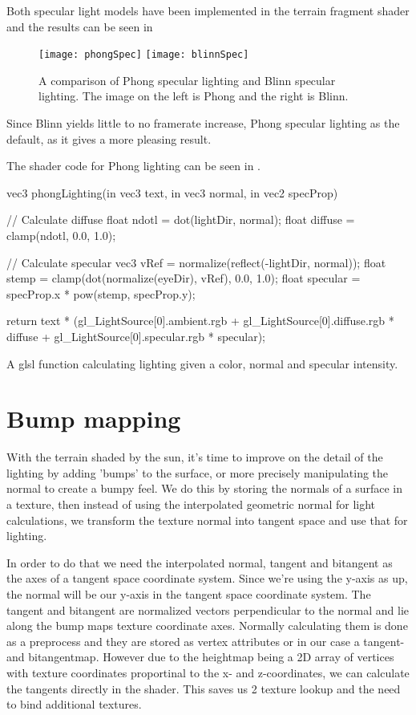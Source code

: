 Both specular light models have been implemented in the terrain
fragment shader and the results can be seen in 

\begin{figure}
  \label{fig:specularLight}
  \centering
  \texttt{[image: phongSpec]}
  \texttt{[image: blinnSpec]}
  \caption{A comparison of Phong specular lighting and Blinn specular lighting. The image on the left is Phong and the right is Blinn.}
\end{figure}

Since Blinn yields little to no framerate increase, Phong specular
lighting as the default, as it gives a more pleasing result.

The shader code for Phong lighting can be seen in
.

\begin{listing}
\label{lst:phongLighting}
\centering
\begin{cppcode}
vec3 phongLighting(in vec3 text, in vec3 normal, in vec2 specProp){
  // Calculate diffuse
  float ndotl = dot(lightDir, normal);
  float diffuse = clamp(ndotl, 0.0, 1.0);
  
  // Calculate specular
  vec3 vRef = normalize(reflect(-lightDir, normal));
  float stemp = clamp(dot(normalize(eyeDir), vRef), 0.0, 1.0);
  float specular = specProp.x * pow(stemp, specProp.y);
  
  return text * (gl_LightSource[0].ambient.rgb + 
                 gl_LightSource[0].diffuse.rgb * diffuse + 
                 gl_LightSource[0].specular.rgb * specular);
}
\end{cppcode}
\caption{A glsl function calculating lighting given a color, normal and specular intensity.}
\end{listing}


\section{Bump mapping}

With the terrain shaded by the sun, it's time to improve on the detail
of the lighting by adding 'bumps' to the surface, or more precisely
manipulating the normal to create a bumpy feel. We do this by storing
the normals of a surface in a texture, then instead of using the
interpolated geometric normal for light calculations, we transform the
texture normal into tangent space and use that for lighting.

In order to do that we need the interpolated normal, tangent and
bitangent as the axes of a tangent space coordinate system. Since
we're using the y-axis as up, the normal will be our y-axis in the
tangent space coordinate system. The tangent and bitangent are
normalized vectors perpendicular to the normal and lie along the bump
maps texture coordinate axes. Normally calculating them is done as a
preprocess and they are stored as vertex attributes or in our case a
tangent- and bitangentmap. However due to the heightmap being a 2D
array of vertices with texture coordinates proportinal to the x- and
z-coordinates, we can calculate the tangents directly in the
shader. This saves us 2 texture lookup and the need to bind additional
textures.

